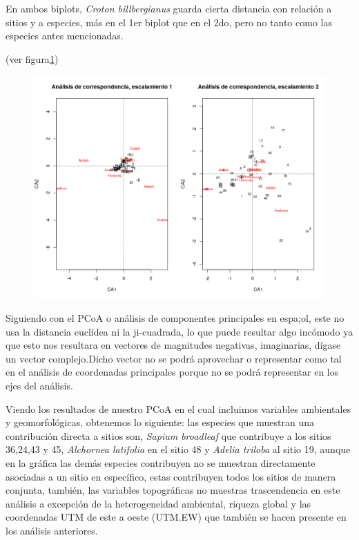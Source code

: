 \documentclass[11pt,]{article}
\begin{document}
En ambos biplots, \emph{Croton billbergianus} guarda cierta distancia
con relación a sitios y a especies, más en el 1er biplot que en el 2do,
pero no tanto como las especies antes mencionadas.

(ver figura\ref{fig:biplot_ca})

\begin{figure}
\centering
\includegraphics{biplot_ca.png}
\caption{\label{fig:biplot_ca}}
\end{figure}

Siguiendo con el PCoA o análisis de componentes principales en espa;ol,
este no usa la distancia euclídea ni la ji-cuadrada, lo que puede
resultar algo incómodo ya que esto nos resultara en vectores de
magnitudes negativas, imaginarias, dígase un vector complejo.Dicho
vector no se podrá aprovechar o representar como tal en el análisis de
coordenadas principales porque no se podrá representar en los ejes del
análisis.

Viendo los resultados de nuestro PCoA en el cual incluimos variables
ambientales y geomorfológicas, obtenemos lo siguiente: las especies que
muestran una contribución directa a sitios son, \emph{Sapium broadleaf}
que contribuye a los sitios 36,24,43 y 45, \emph{Alchornea latifolia} en
el sitio 48 y \emph{Adelia triloba} al sitio 19, aunque en la gráfica
las demás especies contribuyen no se muestran directamente asociadas a
un sitio en específico, estas contribuyen todos los sitios de manera
conjunta, también, las variables topográficas no muestras trascendencia
en este análisis a excepción de la heterogeneidad ambiental, riqueza
global y las coordenadas UTM de este a oeste (UTM.EW) que también se
hacen presente en los análisis anteriores.
\end{document}
